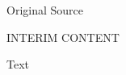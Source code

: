 				\begin{description}
					\item[Original Source]
				\end{description}
				
					INTERIM CONTENT
				
				
				\begin{description}
					\item[Text]
				\end{description}
				
